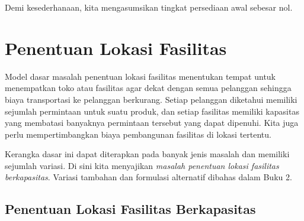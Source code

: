 Demi kesederhanaan, kita mengasumsikan tingkat persediaan awal sebesar nol.

\section{Penentuan Lokasi Fasilitas}
\label{sec:facility-location}
Model dasar masalah penentuan lokasi fasilitas menentukan tempat untuk menempatkan toko atau fasilitas agar dekat dengan semua pelanggan sehingga biaya transportasi ke pelanggan berkurang. Setiap pelanggan diketahui memiliki sejumlah permintaan untuk suatu produk, dan setiap fasilitas memiliki kapasitas yang membatasi banyaknya permintaan tersebut yang dapat dipenuhi. Kita juga perlu mempertimbangkan biaya pembangunan fasilitas di lokasi tertentu.

Kerangka dasar ini dapat diterapkan pada banyak jenis masalah dan memiliki sejumlah variasi. Di sini kita menyajikan \emph{masalah penentuan lokasi fasilitas berkapasitas}. Variasi tambahan dan formulasi alternatif dibahas dalam Buku 2.



\subsection{Penentuan Lokasi Fasilitas Berkapasitas}

